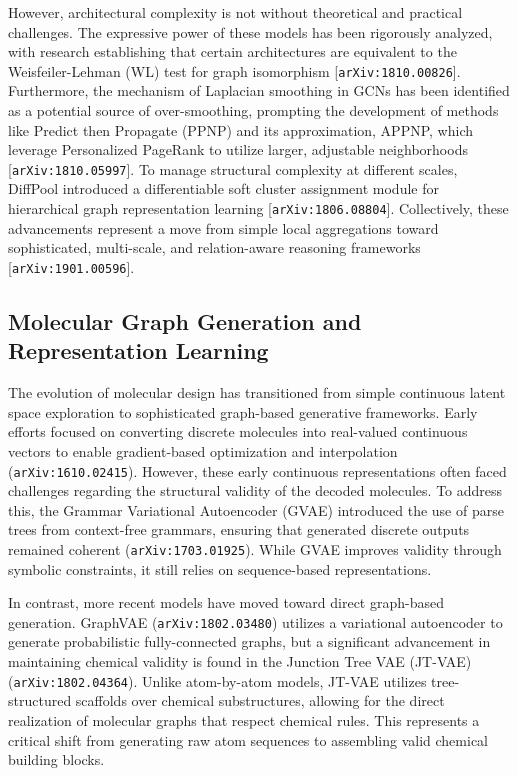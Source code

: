 \documentclass[11pt]{article}
\begin{document}
However, architectural complexity is not without theoretical and practical challenges. The expressive power of these models has been rigorously analyzed, with research establishing that certain architectures are equivalent to the Weisfeiler-Lehman (WL) test for graph isomorphism [\texttt{arXiv:1810.00826}]. Furthermore, the mechanism of Laplacian smoothing in GCNs has been identified as a potential source of over-smoothing, prompting the development of methods like Predict then Propagate (PPNP) and its approximation, APPNP, which leverage Personalized PageRank to utilize larger, adjustable neighborhoods [\texttt{arXiv:1810.05997}]. To manage structural complexity at different scales, DiffPool introduced a differentiable soft cluster assignment module for hierarchical graph representation learning [\texttt{arXiv:1806.08804}]. Collectively, these advancements represent a move from simple local aggregations toward sophisticated, multi-scale, and relation-aware reasoning frameworks [\texttt{arXiv:1901.00596}].

\subsection{Molecular Graph Generation and Representation Learning}

The evolution of molecular design has transitioned from simple continuous latent space exploration to sophisticated graph-based generative frameworks. Early efforts focused on converting discrete molecules into real-valued continuous vectors to enable gradient-based optimization and interpolation (\texttt{arXiv:1610.02415}). However, these early continuous representations often faced challenges regarding the structural validity of the decoded molecules. To address this, the Grammar Variational Autoencoder (GVAE) introduced the use of parse trees from context-free grammars, ensuring that generated discrete outputs remained coherent (\texttt{arXiv:1703.01925}). While GVAE improves validity through symbolic constraints, it still relies on sequence-based representations.

In contrast, more recent models have moved toward direct graph-based generation. GraphVAE (\texttt{arXiv:1802.03480}) utilizes a variational autoencoder to generate probabilistic fully-connected graphs, but a significant advancement in maintaining chemical validity is found in the Junction Tree VAE (JT-VAE) (\texttt{arXiv:1802.04364}). Unlike atom-by-atom models, JT-VAE utilizes tree-structured scaffolds over chemical substructures, allowing for the direct realization of molecular graphs that respect chemical rules. This represents a critical shift from generating raw atom sequences to assembling valid chemical building blocks.
\end{document}
